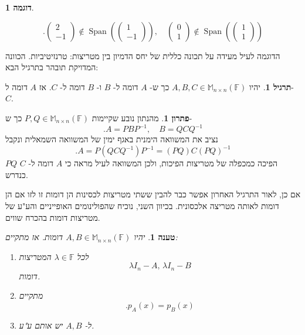 \documentclass[12pt]{report}
\theoremstyle{plain}
\newtheorem{proposition}[theorem]{טענה}
\theoremstyle{definition}
\newtheorem{example}{דוגמה}[chapter]
\newtheorem{exercise}{תרגיל}[chapter]
\newtheorem*{solution}{פתרון}
\newcommand{\F}{\mathbb{F}}
\newcommand{\M}{\mathbb{M}}
\newcommand{\0}{\mathbf{0}}
\DeclareMathOperator{\Span}{Span}
\begin{document}
\begin{example}
\begin{enumerate}[label=\alph*.]
$$
.\begin{pmatrix}2\\-1\end{pmatrix}\notin\Span\left(\begin{pmatrix}1\\-1\end{pmatrix}\right),\quad \begin{pmatrix}0\\1\end{pmatrix}\notin\Span\left(\begin{pmatrix}1\\1\end{pmatrix}\right)
$$

\end{enumerate}
\end{example}

הדוגמה לעיל מעידה על תכונה כללית של יחס הדמיון בין מטריצות: טרנזיטיביות. הכוונה המדויקת תובהר בתרגיל הבא:

\begin{exercise}
יהיו 
$A,B,C\in\M_{n\times n}(\F)$
כך ש-
$A$
דומה ל-
$B$
ו-
$B$
דומה ל-
$C$.
אז
$A$
דומה ל-
$C$.
\end{exercise}

\begin{solution}
מהנתון נובע שקיימות
$P,Q\in\M_{n\times n}(\F)$
כך ש-
$$
.A=PBP^{-1},\quad B=QCQ^{-1}
$$
נציב את המשוואה הימנית באגף ימין של המשוואה השמאלית ונקבל
$$
.A=P(QCQ^{-1})P^{-1}=(PQ)C(PQ)^{-1}
$$
$PQ$
הפיכה כמכפלה של מטריצות הפיכות, ולכן המשוואה לעיל מראה כי
$A$
דומה ל-
$C$
כנדרש.
\end{solution}

אם כן, לאור התרגיל האחרון אפשר כבר להבין ששתי מטריצות לכסינות הן דומות זו לזו אם הן דומות לאותה מטריצה אלכסונית. בכיוון השני, נוכיח שהפולינומים האופייניים והע"ע של מטריצות דומות בהכרח שווים.

\begin{proposition}\label{prop:char-poly}
יהיו
$A,B\in\M_{n\times n}(\F)$
דומות. אז מתקיים:
\begin{enumerate}[label=\alph*.]
\item
לכל
$\lambda\in\F$
המטריצות
$$
\lambda I_n-A,\,\lambda I_n-B
$$
דומות.


\item 
מתקיים
$$
.p_A(x)=p_B(x)
$$


\item 
ל-
$A,B$
יש אותם ע"ע.


\end{enumerate}
\end{proposition}
\end{document}

